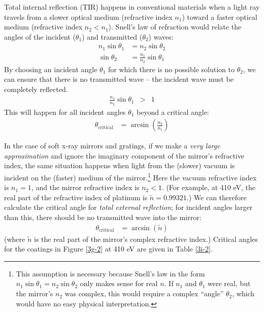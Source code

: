 Total internal reflection (TIR) happens in conventional materials when a light ray travels from a slower optical medium (refractive index $n_1$) toward a faster optical medium (refractive index $n_2 < n_1$).  Snell's law of refraction would relate the angles of the incident ($\theta_1$) and transmitted ($\theta_2$) waves:
\begin{align}
n_1 \sin \theta_1 &= n_2 \sin \theta_2 \\
\sin \theta_2 &= \frac{n_1}{n_2} \sin \theta_1
\end{align}
By choosing an incident angle $\theta_1$ for which there is no possible solution to $\theta_2$, we can ensure that there is no transmitted wave -- the incident wave must be completely reflected.
\begin{align}
 \frac{n_1}{n_2} \sin \theta_1 &>& 1
\end{align}
This will happen for all incident angles $\theta_1$ beyond a critical angle:
\begin{align}
\theta_{\mathrm{critical}} &= \arcsin \left( \frac{n_2}{n_1} \right)
\end{align}

In the case of soft x-ray mirrors and gratings, if we make a \emph{very large approximation} and ignore the imaginary component of the mirror's refractive index, the same situation happens when light from the (slower) vacuum is incident on the (faster) medium of the mirror.\footnote{This assumption is necessary because Snell's law in the form $n_1 \sin \theta_1 = n_2 \sin \theta_2$ only makes sense for real $n$.  If $n_1$ and $\theta_1$ were real, but the mirror's $n_2$ was complex, this would require a complex ``angle'' $\theta_2$, which would have no easy physical interpretation.}  Here the vacuum refractive index is $n_1=1$, and the mirror refractive index is ${n}_2<1$.  (For example, at 410 eV, the real part of the refractive index of platinum is $\tilde{n} = 0.99321$.)  We can therefore calculate the critical angle for \emph{total external reflection}; for incident angles larger than this, there should be no transmitted wave into the mirror:
\begin{align}
\theta_{\mathrm{critical}} &= \arcsin \left( \tilde n \right)
\end{align}
(where $\tilde n$ is the real part of the mirror's complex refractive index.)  Critical angles for the coatings in Figure \ref{3g-2} at 410 eV are given in Table \ref{3i-2}.

